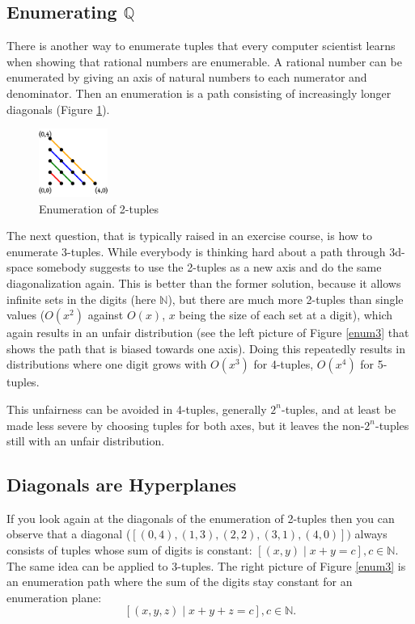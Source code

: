 \documentclass{tmr}
\begin{document}
\subsection{Enumerating $\mathbb{Q} $}
There is another way to enumerate tuples that every computer scientist learns when showing that rational numbers are enumerable. A rational number can be enumerated by giving an axis of natural numbers to each numerator and denominator. Then an enumeration is a path consisting of increasingly longer diagonals (Figure \ref{enum2}).

\begin{figure}[htbp]
  \centering
     \includegraphics[width=0.2\textwidth]{enum2c.pdf}
  \caption{Enumeration of 2-tuples}
  \label{enum2}
\end{figure}

The next question, that is typically raised in an exercise course, is how to enumerate 3-tuples.
While everybody is thinking hard about a path through 3d-space somebody suggests to use the 2-tuples as a new axis and do the same diagonalization again. This is better than the former solution, because it allows infinite sets in the digits (here $\mathbb{N}$), but there are much more 2-tuples  than single values ($O(x^2)$ against $O(x)$, $x$ being the size of each set at a digit), which again results in an unfair distribution (see the left picture of Figure \ref{enum3} that shows the path that is biased towards one axis). Doing this repeatedly results in distributions where one digit grows with $O(x^3)$ for 4-tuples, $O(x^4)$ for 5-tuples.

This unfairness can be avoided in 4-tuples, generally $2^n$-tuples, and at least be made less severe by choosing tuples for both axes, but it leaves the non-$2^n$-tuples still with an unfair distribution.

\subsection{Diagonals are Hyperplanes}
If you look again at the diagonals of the enumeration of 2-tuples then you can observe that a diagonal (\eg $ [ (0,4), (1,3), (2,2), (3,1), (4,0) ])$ always consists of tuples whose sum of digits is constant:
$  [ (x,y)  \mid  x+y  = c ], c \in \mathbb{N}. $
The same idea can be applied to 3-tuples. The right picture of Figure \ref{enum3} is an enumeration path where the sum of the digits stay constant for an enumeration plane:
\[  [ (x,y,z)  \mid  x+y+z  = c ], c \in \mathbb{N}. \]
\end{document}
